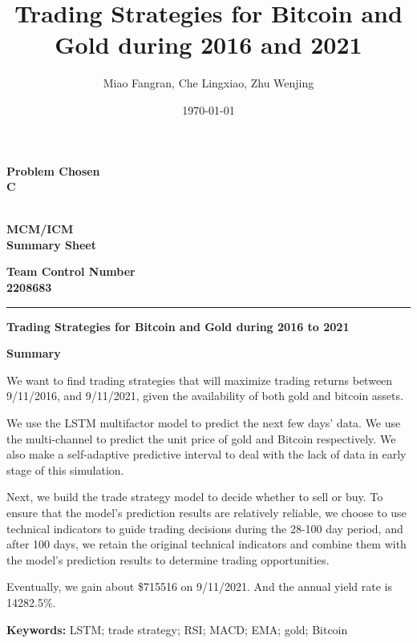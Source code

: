 \documentclass[12pt]{article}
\title{Trading Strategies for Bitcoin and Gold during 2016 and 2021}
\author{Miao Fangran, Che Lingxiao, Zhu Wenjing}
\date{\today}
\gdef\MCMcontrol{2208683}%
\newcommand{\problem}{C}%
\newcommand{\headset}{{\the\year}\\MCM/ICM\\Summary Sheet}
\renewenvironment{abstract}[1]{%
    \small
    \begin{center}%
    {\large\bfseries #1\vspace{-.5em}}%
    \end{center}}
    {}
\newcommand\keywords[1]{%
    \begingroup
    \par
    \noindent\textbf{Keywords:} #1\par
    \endgroup
}
\begin{document}
    \thispagestyle{empty}
    \begingroup
    \setlength{\parindent}{0pt}
    \begin{minipage}[t]{0.33\linewidth}
        \bfseries\centering%
        Problem Chosen\\[0.7pc]
        {\Huge\textbf{\problem}}\\[2.8pc]
    \end{minipage}%
    \begin{minipage}[t]{0.33\linewidth}
        \centering%
        \textbf{\headset}%
    \end{minipage}%
    \begin{minipage}[t]{0.33\linewidth}
        \centering\bfseries%
        Team Control Number\\[0.7pc]
        {\Huge\textbf{\MCMcontrol}}\\[2.8pc]
    \end{minipage}\par
    \rule{\linewidth}{0.8pt}\par
    \par
    \endgroup

    \bigskip

    \centerline{\Large\bfseries Trading Strategies for Bitcoin and Gold during 2016 to 2021}

    \begin{abstract}{Summary}

        We want to find trading strategies that will maximize trading returns between 9/11/2016, and 9/11/2021, given the availability of both gold and bitcoin assets.
        
        We use the LSTM multifactor model to predict the next few days' data.
        We use the multi-channel to predict the unit price of gold and Bitcoin respectively.
        We also make a self-adaptive predictive interval to deal with the lack of data in early stage of this simulation.
        
        Next, we build the trade strategy model to decide whether to sell or buy.
        To ensure that the model's prediction results are relatively reliable, we choose to use technical indicators to guide trading decisions during the 28-100 day period, and after 100 days, we retain the original technical indicators and combine them with the model's prediction results to determine trading opportunities.
        
        Eventually, we gain about \$715516 on 9/11/2021.
        And the annual yield rate is 14282.5\%.
        \keywords{LSTM; trade strategy; RSI; MACD; EMA; gold; Bitcoin}
    \end{abstract}
\end{document}
